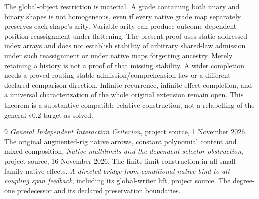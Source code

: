 \documentclass[11pt]{article}
\begin{document}
The global-object restriction is material. A grade containing both unary and binary shapes is not homogeneous, even if every native grade map separately preserves each shape's arity. Variable arity can produce outcome-dependent position reassignment under flattening. The present proof uses static addressed index arrays and does not establish stability of arbitrary shared-law admission under such reassignment or under native maps forgetting ancestry. Merely retaining a history is not a proof of that missing stability. A wider completion needs a proved routing-stable admission/comprehension law or a different declared comparison direction. Infinite recurrence, infinite-effect completion, and a universal characterization of the whole original extension remain open. This theorem is a substantive compatible relative construction, not a relabelling of the general v0.2 target as solved.
\begin{thebibliography}{9}
 \emph{General Independent Interaction Criterion}, project source, 1 November 2026. The original augmented-rig native arrows, constant polynomial content and mixed composition.
 \emph{Native multilimits and the dependent-selector obstruction}, project source, 16 November 2026. The finite-limit construction in all-small-family native effects.
 \emph{A directed bridge from conditional native bind to all-coupling span feedback}, including its global-writer lift, project source. The degree-one predecessor and its declared preservation boundaries.
\end{thebibliography}
\end{document}
